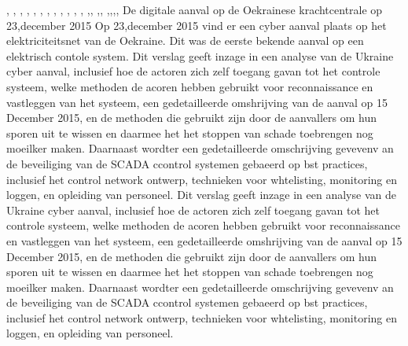 \cite{kingskey19042022tjernobyl},
\cite{erikbork26042023reactor4},
\cite{nosTjernobyl30jaarlater},
\cite{knmi04052021tjernobylbosbrand},
\cite{dodonovaKVIRisicoTjernobyl},
\cite{dumarey04062020verhaalTjernobylWaarheid},
\cite{sparkesNewScientistTjernoby},
\cite{kernenergiened26041986chronologiemaatregelen},
\cite{mapszoneReactor},
\cite{kernhistoriek15062021tjernobyl},
\cite{nucleairforumFeitenTjernobyl},
\cite{kernongevalTjernobylFancGov},
\cite{arendswolters062019lessenTjernobyl},\cite{damveld08052020tjernobyl},
\cite{deVriestjernobylHolland},\cite{ing3enieur29042015antistralingskoepel},
\cite{verschuur14012013tjernobylreports},\cite{paperlessarchivesTjernobyl},\cite{vargos082000tjernobylconcerns},\cite{mauroNuclearRiskSociety},\cite{vienna06092005LookingBack}
\newline \indent  De digitale aanval op de Oekrainese krachtcentrale op 23,december 2015
Op 23,december 2015  vind er een cyber aanval plaats op het elektriciteitsnet van de Oekraine. Dit was de eerste bekende aanval op een elektrisch contole  system.  Dit verslag geeft inzage in een analyse van de Ukraine cyber aanval,
inclusief hoe de actoren zich zelf toegang gavan tot het controle systeem, welke methoden de acoren hebben gebruikt voor reconnaissance en vastleggen van het systeem, een gedetailleerde omshrijving van de aanval op 15 December 2015, en de methoden die gebruikt zijn door de aanvallers om hun sporen uit te wissen en daarmee het het stoppen van schade toebrengen  nog moeilker maken. Daarnaast wordter  een gedetailleerde omschrijving gevevenv an de beveiliging van de SCADA ccontrol systemen gebaeerd op bst practices, inclusief het control network ontwerp, technieken voor whtelisting, monitoring en loggen, en  opleiding van personeel.
\cite{Whitehead2017ukrainepoweroutage}
\cite{zetter2016GridHack}
\cite{owens21032017ukrainemitigationstrategies}
\cite{cerulus2019FrontlineRussiaAttack}
\cite{grammatikis2019AttackIEC6087505104}
\cite{hidajat2016ScadaSimulator}
\cite{uscert20072021crashmalware}
\cite{zetter12062017malwareanalysis}
\cite{icsRussianHackingCyberWeapon}
\cite{usgovC2M2}
Dit verslag geeft inzage in een analyse van de Ukraine cyber aanval,
inclusief hoe de actoren zich zelf toegang gavan tot het controle systeem, welke methoden de acoren hebben gebruikt voor reconnaissance en vastleggen van het systeem, een gedetailleerde omshrijving van de aanval op 15 December 2015, en de methoden die gebruikt zijn door de aanvallers om hun sporen uit te wissen en daarmee het het stoppen van schade toebrengen  nog moeilker maken. Daarnaast wordter  een gedetailleerde omschrijving gevevenv an de beveiliging van de SCADA ccontrol systemen gebaeerd op bst practices, inclusief het control network ontwerp, technieken voor whtelisting, monitoring en loggen, en  opleiding van personeel.
